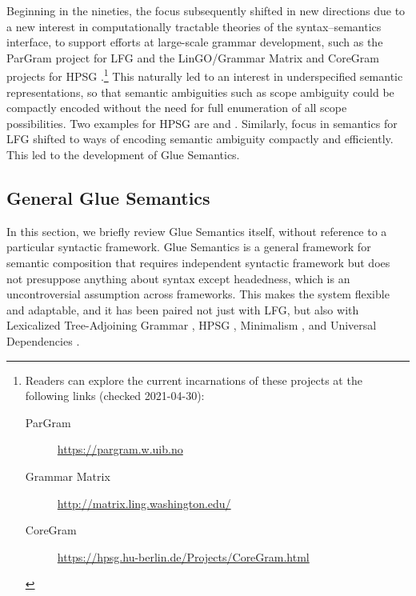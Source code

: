 Beginning in the nineties, the focus subsequently shifted in new directions due to a new interest in computationally tractable
theories of the syntax--semantics interface, to support efforts at
large-scale grammar development, such as the ParGram project for LFG
\citep{butt;ea99,butt;ea02-pargram} and the LinGO/Grammar Matrix and CoreGram projects for HPSG
\citep{flickinger00,bender;ea02,bender;ea10,MuellerCoreGram}.\footnote{Readers can
  explore the current incarnations of these projects at the following
links (checked 2021-04-30):
\begin{description}
\item[ParGram] \url{https://pargram.w.uib.no}
\item[Grammar Matrix] \url{http://matrix.ling.washington.edu/}
\item[CoreGram] \url{https://hpsg.hu-berlin.de/Projects/CoreGram.html}
\end{description}
} This naturally led to an
interest in underspecified semantic representations, so that semantic
ambiguities such as scope ambiguity could be compactly encoded without
the need for full enumeration of all scope possibilities. Two examples
for HPSG are  \citep{richter04,penn;richter04}
and 
\citep{copestake;ea05}. Similarly, focus in semantics for LFG shifted
to ways of encoding semantic ambiguity compactly and efficiently. This
led to the development of Glue Semantics.



\subsection{General Glue Semantics}
\label{sec:glue-semantics}

In this section, we briefly review Glue Semantics itself, 
without reference to a particular
syntactic framework.  Glue Semantics is a general framework for
semantic composition that requires  independent syntactic
framework but does not presuppose anything about syntax except
headedness, which is an uncontroversial assumption across
frameworks. This makes the system flexible and adaptable, and it has
been paired not just with LFG, but also with Lexicalized
Tree-Adjoining Grammar \citep{frank;genabith01}, HPSG
\citep{asudeh;crouch01-hpsg-glue}, Minimalism \citep{Gotham2018}, and
Universal Dependencies \citep{gotham;haug18}.

